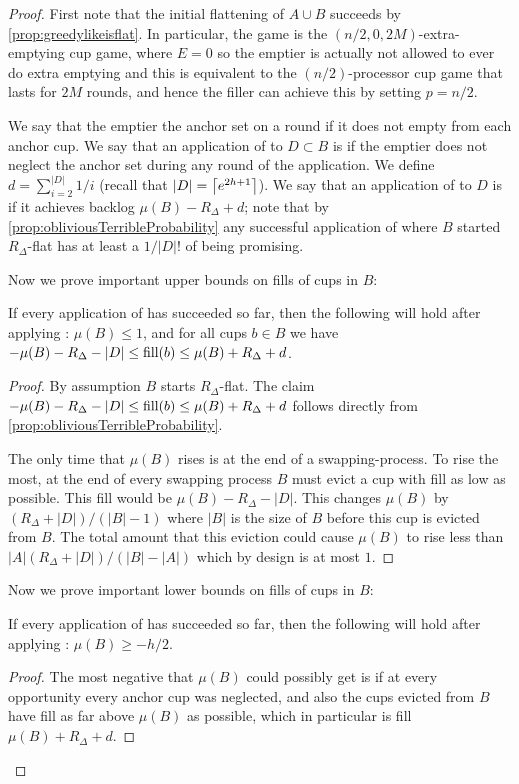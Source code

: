 \begin{proof}
First note that the initial flattening of $A\cup B$ succeeds by
\cref{prop:greedylikeisflat}. In particular, the game is the 
$(n/2, 0, 2M)$-extra-emptying cup game, where $E=0$ so the
emptier is actually not allowed to ever do extra emptying and
this is equivalent to the $(n/2)$-processor cup game that lasts
for $2M$ rounds, and hence the filler can achieve this by setting
$p=n/2$.

We say that the emptier  the anchor set on a round
if it does not empty from each anchor cup. We say that an
application of \randalg to $D\subset B$ is  if
the emptier does not neglect the anchor set during any round of
the application. We define $d = \sum_{i=2}^{|D|} 1/i$ (recall
that $|D| = \left\lceil e^{2h+1} \right\rceil$). We say that an application of
\randalg to $D$ is  if it achieves backlog
$\mu(B) - R_\Delta + d$; note that by 
\cref{prop:obliviousTerribleProbability} any successful
application of \randalg where $B$ started $R_\Delta$-flat has
at least a $1/|D|!$ of being promising. 


Now we prove important upper bounds on fills of cups in $B$:
\begin{clm}
  If every application of \flatalg has succeeded so far, then the
  following will hold after applying \randalg: $\mu(B)\le 1$, and
  for all cups $b\in B$ we have $-\mu(B) - R_\Delta - |D| \le
  \operatorname{\textnormal{fill}}(b)\le \mu(B) + R_\Delta + d$.
\end{clm}
\begin{proof}
  By assumption $B$ starts $R_\Delta$-flat.
  The claim $-\mu(B) - R_\Delta - |D| \le
  \operatorname{\textnormal{fill}}(b)\le \mu(B) + R_\Delta + d$ follows directly from
  \cref{prop:obliviousTerribleProbability}.

  The only time that $\mu(B)$ rises is at the end of a
  swapping-process. To rise the most, at the end of every
  swapping process $B$ must evict a cup with fill as low as
  possible. This fill would be $\mu(B) - R_\Delta - |D|$.
  This changes $\mu(B)$ by $(R_\Delta + |D|) / (|B|-1)$ where $|B|$
  is the size of $B$ before this cup is evicted from $B$. The
  total amount that this eviction could cause $\mu(B)$ to rise
  less than $|A| (R_\Delta + |D|) / (|B|-|A|)$ which by design is
  at most $1$.
\end{proof}

Now we prove important lower bounds on fills of cups in $B$:
\begin{clm}
  If every application of \flatalg has succeeded so far, then the
  following will hold after applying \randalg: $\mu(B) \ge
  -h/2$. 
\end{clm}
\begin{proof}
  The most negative that $\mu(B)$ could possibly get is if at
  every opportunity every anchor cup was neglected, and also the
  cups evicted from $B$ have fill as far above $\mu(B)$ as
  possible, which in particular is fill $\mu(B) + R_\Delta + d$.


\end{proof}
\end{proof}
